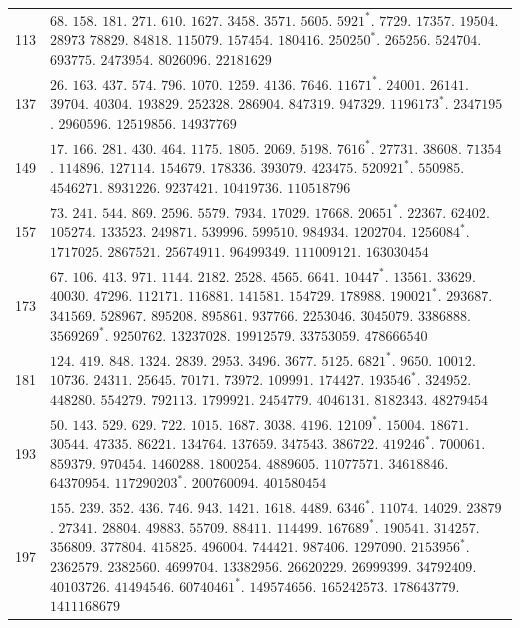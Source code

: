 %
\begingroup\small\setlength{\tabcolsep}{5pt}
\begin{longtable}{@{}r|p{\dimexpr\linewidth-38pt\relax}@{}}
113 & $68$. $158$. $181$. $271$. $610$. $1627$. $3458$. $3571$. $5605$. $5921^{*}$. $7729$. $17357$. $19504$. $28973$ $78829$. $84818$. $115079$. $157454$. $180416$. $250250^{*}$. $265256$. $524704$. $693775$. $2473954$. $8026096$. $22181629$\\
137 & $26$. $163$. $437$. $574$. $796$. $1070$. $1259$. $4136$. $7646$. $11671^{*}$. $24001$. $26141$. $39704$. $40304$. $193829$. $252328$. $286904$. $847319$. $947329$. $1196173^{*}$. $2347195$. $2960596$. $12519856$. $14937769$\\
149 & $17$. $166$. $281$. $430$. $464$. $1175$. $1805$. $2069$. $5198$. $7616^{*}$. $27731$. $38608$. $71354$. $114896$. $127114$. $154679$. $178336$. $393079$. $423475$. $520921^{*}$. $550985$. $4546271$. $8931226$. $9237421$. $10419736$. $110518796$\\
157 & {\raggedright $73$. $241$. $544$. $869$. $2596$. $5579$. $7934$. $17029$. $17668$. $20651^{*}$. $22367$. $62402$. $105274$. $133523$. $249871$. $539996$. $599510$. $984934$. $1202704$. $1256084^{*}$. $1717025$. $2867521$. $25674911$. $96499349$. $111009121$. $163030454$\par}\\
173 & $67$. $106$. $413$. $971$. $1144$. $2182$. $2528$. $4565$. $6641$. $10447^{*}$. $13561$. $33629$. $40030$. $47296$. $112171$. $116881$. $141581$. $154729$. $178988$. $190021^{*}$. $293687$. $341569$. $528967$. $895208$. $895861$. $937766$. $2253046$. $3045079$. $3386888$. $3569269^{*}$. $9250762$. $13237028$. $19912579$. $33753059$. $478666540$\\
181 & $124$. $419$. $848$. $1324$. $2839$. $2953$. $3496$. $3677$. $5125$. $6821^{*}$. $9650$. $10012$. $10736$. $24311$. $25645$. $70171$. $73972$. $109991$. $174427$. $193546^{*}$. $324952$. $448280$. $554279$. $792113$. $1799921$. $2454779$. $4046131$. $8182343$. $48279454$\\
193 & $50$. $143$. $529$. $629$. $722$. $1015$. $1687$. $3038$. $4196$. $12109^{*}$. $15004$. $18671$. $30544$. $47335$. $86221$. $134764$. $137659$. $347543$. $386722$. $419246^{*}$. $700061$. $859379$. $970454$. $1460288$. $1800254$. $4889605$. $11077571$. $34618846$. $64370954$. $117290203^{*}$. $200760094$. $401580454$\\
197 & $155$. $239$. $352$. $436$. $746$. $943$. $1421$. $1618$. $4489$. $6346^{*}$. $11074$. $14029$. $23879$. $27341$. $28804$. $49883$. $55709$. $88411$. $114499$. $167689^{*}$. $190541$. $314257$. $356809$. $377804$. $415825$. $496004$. $744421$. $987406$. $1297090$. $2153956^{*}$. $2362579$. $2382560$. $4699704$. $13382956$. $26620229$. $26999399$. $34792409$. $40103726$. $41494546$. $60740461^{*}$. $149574656$. $165242573$. $178643779$. $1411168679$\\
\end{longtable}\endgroup
